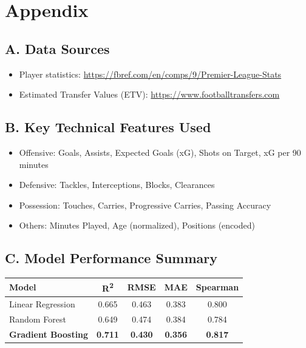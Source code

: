 \documentclass[12pt,a4paper]{article}
\begin{document}
\section*{Appendix}

\subsection*{A. Data Sources}
\begin{itemize}
    \item Player statistics: \url{https://fbref.com/en/comps/9/Premier-League-Stats}
    \item Estimated Transfer Values (ETV): \url{https://www.footballtransfers.com}
\end{itemize}

\subsection*{B. Key Technical Features Used}
\begin{itemize}
    \item Offensive: Goals, Assists, Expected Goals (xG), Shots on Target, xG per 90 minutes
    \item Defensive: Tackles, Interceptions, Blocks, Clearances
    \item Possession: Touches, Carries, Progressive Carries, Passing Accuracy
    \item Others: Minutes Played, Age (normalized), Positions (encoded)
\end{itemize}

\subsection*{C. Model Performance Summary}
\begin{center}
\begin{tabular}{lcccc}
\toprule
\textbf{Model} & \textbf{R\textsuperscript{2}} & \textbf{RMSE} & \textbf{MAE} & \textbf{Spearman} \\
\midrule
Linear Regression & 0.665 & 0.463 & 0.383 & 0.800 \\
Random Forest & 0.649 & 0.474 & 0.384 & 0.784 \\
\textbf{Gradient Boosting} & \textbf{0.711} & \textbf{0.430} & \textbf{0.356} & \textbf{0.817} \\
\bottomrule
\end{tabular}
\end{center}
\end{document}
